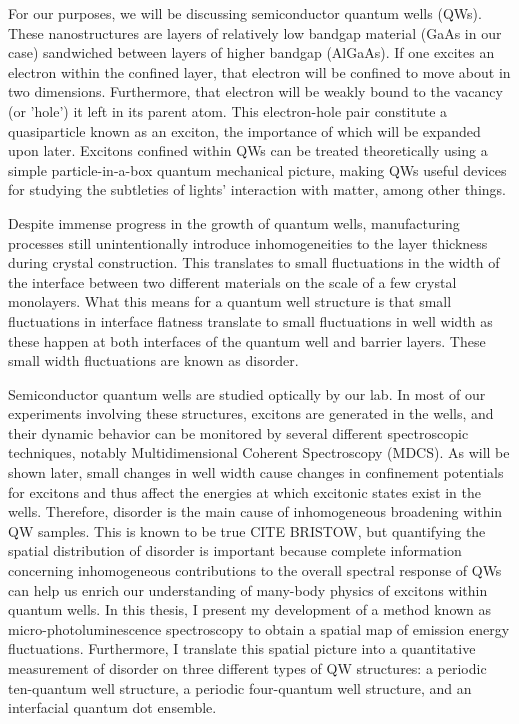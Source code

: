 \indent For our purposes, we will be discussing semiconductor quantum wells (QWs). These nanostructures are layers of relatively low bandgap material (GaAs in our case) sandwiched between layers of higher bandgap (AlGaAs). If one excites an electron within the confined layer, that electron will be confined to move about in two dimensions. Furthermore, that electron will be weakly bound to the vacancy (or 'hole') it left in its parent atom. This electron-hole pair constitute a quasiparticle known as an exciton, the importance of which will be expanded upon later. Excitons confined within QWs can be treated theoretically using a simple particle-in-a-box quantum mechanical picture, making QWs useful devices for studying the subtleties of lights' interaction with matter, among other things.

\indent Despite immense progress in the growth of quantum wells, manufacturing processes still unintentionally introduce inhomogeneities to the layer thickness during crystal construction. This translates to small fluctuations in the width of the interface between two different materials on the scale of a few crystal monolayers. What this means for a quantum well structure is that small fluctuations in interface flatness translate to small fluctuations in well width as these happen at both interfaces of the quantum well and barrier layers. These small width fluctuations are known as disorder.

\indent Semiconductor quantum wells are studied optically by our lab. In most of our experiments involving these structures, excitons are generated in the wells, and their dynamic behavior can be monitored by several different spectroscopic techniques, notably Multidimensional Coherent Spectroscopy (MDCS). As will be shown later, small changes in well width cause changes in confinement potentials for excitons and thus affect the energies at which excitonic states exist in the wells. Therefore, disorder is the main cause of inhomogeneous broadening within QW samples. This is known to be true CITE BRISTOW, but quantifying the spatial distribution of disorder is important because complete information concerning inhomogeneous contributions to the overall spectral response of QWs can help us enrich our understanding of many-body physics of excitons within quantum wells. In this thesis, I present my development of a method known as micro-photoluminescence spectroscopy to obtain a spatial map of emission energy fluctuations. Furthermore, I translate this spatial picture into a quantitative measurement of disorder on three different types of QW structures: a periodic ten-quantum well structure, a periodic four-quantum well structure, and an interfacial quantum dot ensemble. 